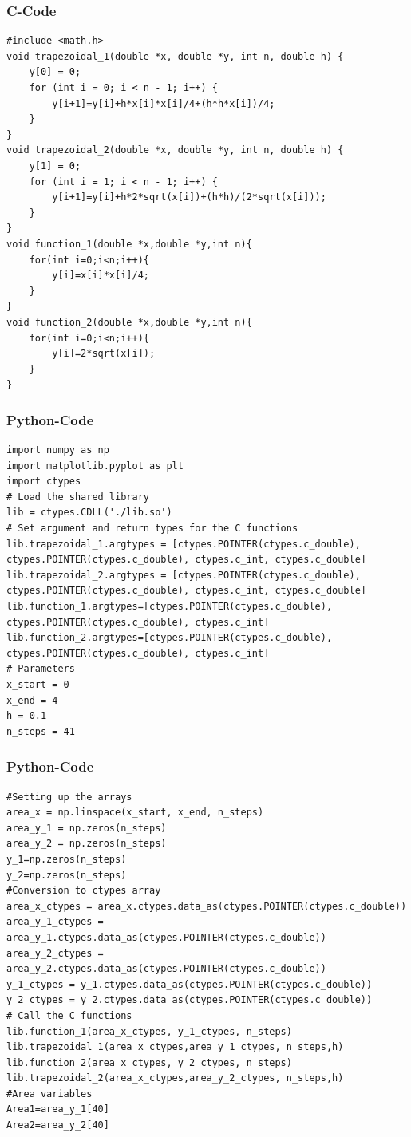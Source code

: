 \documentclass{beamer}
\begin{document}
\begin{frame}[fragile]
\frametitle{C-Code}
\begin{verbatim}
#include <math.h>
void trapezoidal_1(double *x, double *y, int n, double h) {
    y[0] = 0; 
    for (int i = 0; i < n - 1; i++) {
        y[i+1]=y[i]+h*x[i]*x[i]/4+(h*h*x[i])/4;
    }
}
void trapezoidal_2(double *x, double *y, int n, double h) {
    y[1] = 0; 
    for (int i = 1; i < n - 1; i++) {
        y[i+1]=y[i]+h*2*sqrt(x[i])+(h*h)/(2*sqrt(x[i]));
    }
}
void function_1(double *x,double *y,int n){
	for(int i=0;i<n;i++){
		y[i]=x[i]*x[i]/4;
	}
}
void function_2(double *x,double *y,int n){
	for(int i=0;i<n;i++){
		y[i]=2*sqrt(x[i]);
	}
}
\end{verbatim}
\end{frame}
\begin{frame}[fragile]
\frametitle{Python-Code}
\begin{verbatim}
import numpy as np
import matplotlib.pyplot as plt
import ctypes
# Load the shared library
lib = ctypes.CDLL('./lib.so')
# Set argument and return types for the C functions
lib.trapezoidal_1.argtypes = [ctypes.POINTER(ctypes.c_double), ctypes.POINTER(ctypes.c_double), ctypes.c_int, ctypes.c_double]
lib.trapezoidal_2.argtypes = [ctypes.POINTER(ctypes.c_double), ctypes.POINTER(ctypes.c_double), ctypes.c_int, ctypes.c_double]
lib.function_1.argtypes=[ctypes.POINTER(ctypes.c_double), ctypes.POINTER(ctypes.c_double), ctypes.c_int]
lib.function_2.argtypes=[ctypes.POINTER(ctypes.c_double), ctypes.POINTER(ctypes.c_double), ctypes.c_int]
# Parameters
x_start = 0
x_end = 4
h = 0.1
n_steps = 41

\end{verbatim}
\end{frame}
\begin{frame}[fragile]
\frametitle{Python-Code}
\begin{verbatim}
#Setting up the arrays
area_x = np.linspace(x_start, x_end, n_steps)
area_y_1 = np.zeros(n_steps)
area_y_2 = np.zeros(n_steps)
y_1=np.zeros(n_steps)
y_2=np.zeros(n_steps)
#Conversion to ctypes array
area_x_ctypes = area_x.ctypes.data_as(ctypes.POINTER(ctypes.c_double))
area_y_1_ctypes = area_y_1.ctypes.data_as(ctypes.POINTER(ctypes.c_double))
area_y_2_ctypes = area_y_2.ctypes.data_as(ctypes.POINTER(ctypes.c_double))
y_1_ctypes = y_1.ctypes.data_as(ctypes.POINTER(ctypes.c_double))
y_2_ctypes = y_2.ctypes.data_as(ctypes.POINTER(ctypes.c_double))
# Call the C functions
lib.function_1(area_x_ctypes, y_1_ctypes, n_steps)
lib.trapezoidal_1(area_x_ctypes,area_y_1_ctypes, n_steps,h)
lib.function_2(area_x_ctypes, y_2_ctypes, n_steps)
lib.trapezoidal_2(area_x_ctypes,area_y_2_ctypes, n_steps,h)
#Area variables
Area1=area_y_1[40]
Area2=area_y_2[40]

\end{verbatim}
\end{frame}
\end{document}
